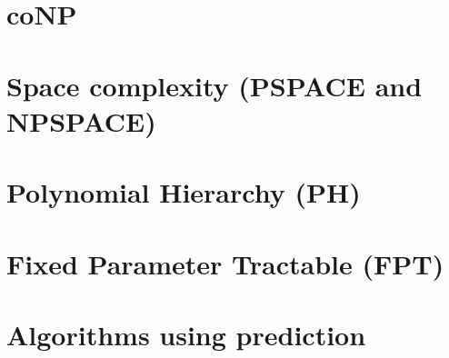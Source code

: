 \documentclass[12pt]{article}
\begin{document}
\section{coNP}

\section{Space complexity (PSPACE and NPSPACE)}

\section{Polynomial Hierarchy (PH)}

\section{Fixed Parameter Tractable (FPT)}

\section{Algorithms using prediction}
\end{document}
